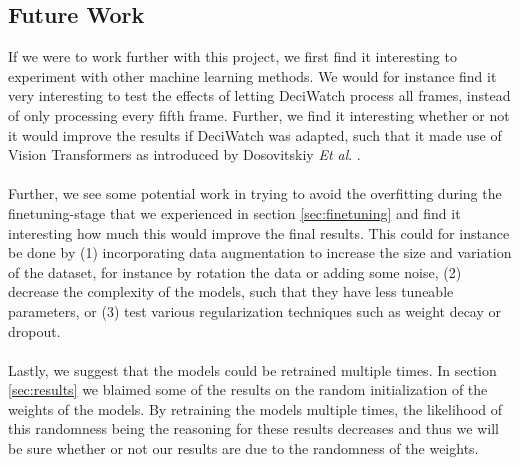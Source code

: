 \documentclass[./main.tex]{subfiles}
\begin{document}
\subsection{Future Work}
If we were to work further with this project, we first find it interesting to experiment with other machine learning methods. We would for instance find it very interesting to test the effects of letting DeciWatch process all frames, instead of only processing every fifth frame. Further, we find it interesting whether or not it would improve the results if DeciWatch was adapted, such that it made use of Vision Transformers as introduced by Dosovitskiy \textit{Et al}. \cite{dosovitskiy2021image}.
\\
\\
Further, we see some potential work in trying to avoid the overfitting during the finetuning-stage that we experienced in section \ref{sec:finetuning} and find it interesting how much this would improve the final results. This could for instance be done by (1) incorporating data augmentation to increase the size and variation of the dataset, for instance by rotation the data or adding some noise, (2) decrease the complexity of the models, such that they have less tuneable parameters, or (3) test various regularization techniques such as weight decay or dropout.
\\
\\
Lastly, we suggest that the models could be retrained multiple times. In section \ref{sec:results} we blaimed some of the results on the random initialization of the weights of the models. By retraining the models multiple times, the likelihood of this randomness being the reasoning for these results decreases and thus we will be sure whether or not our results are due to the randomness of the weights.
\end{document}
